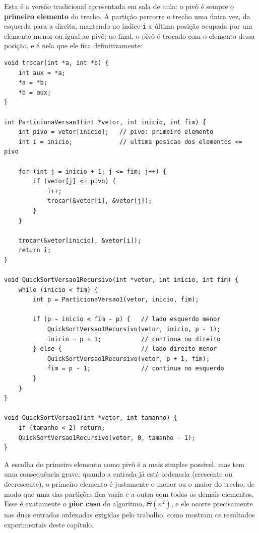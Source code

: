 \qquad Esta é a versão tradicional apresentada em sala de aula: o pivô é
sempre o \textbf{primeiro elemento} do trecho. A partição percorre o
trecho uma única vez, da esquerda para a direita, mantendo no índice
\texttt{i} a última posição ocupada por um elemento menor ou igual ao
pivô; ao final, o pivô é trocado com o elemento dessa posição, e é
nela que ele fica definitivamente:

\begin{verbatim}
void trocar(int *a, int *b) {
    int aux = *a;
    *a = *b;
    *b = aux;
}

int ParticionaVersao1(int *vetor, int inicio, int fim) {
    int pivo = vetor[inicio];   // pivo: primeiro elemento
    int i = inicio;             // ultima posicao dos elementos <= pivo

    for (int j = inicio + 1; j <= fim; j++) {
        if (vetor[j] <= pivo) {
            i++;
            trocar(&vetor[i], &vetor[j]);
        }
    }

    trocar(&vetor[inicio], &vetor[i]);
    return i;
}

void QuickSortVersao1Recursivo(int *vetor, int inicio, int fim) {
    while (inicio < fim) {
        int p = ParticionaVersao1(vetor, inicio, fim);

        if (p - inicio < fim - p) {   // lado esquerdo menor
            QuickSortVersao1Recursivo(vetor, inicio, p - 1);
            inicio = p + 1;           // continua no direito
        } else {                      // lado direito menor
            QuickSortVersao1Recursivo(vetor, p + 1, fim);
            fim = p - 1;              // continua no esquerdo
        }
    }
}

void QuickSortVersao1(int *vetor, int tamanho) {
    if (tamanho < 2) return;
    QuickSortVersao1Recursivo(vetor, 0, tamanho - 1);
}
\end{verbatim}

\qquad A escolha do primeiro elemento como pivô é a mais simples
possível, mas tem uma consequência grave: quando a entrada já está
ordenada (crescente ou decrescente), o primeiro elemento é
justamente o menor ou o maior do trecho, de modo que uma das
partições fica vazia e a outra com todos os demais elementos. Esse é
exatamente o \textbf{pior caso} do algoritmo, $\Theta(n^2)$, e ele
ocorre precisamente nas duas entradas ordenadas exigidas pelo
trabalho, como mostram os resultados experimentais deste capítulo.

